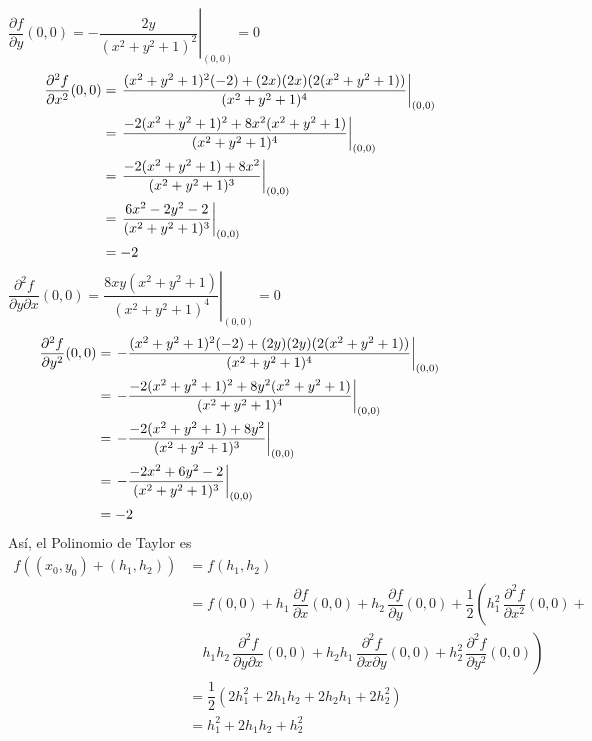 \documentclass[fleqn, 12pt]{article}
\newcommand{\derivadaparcial}[2]{\dfrac{\partial {#1}}{\partial {#2}}}
\newcommand{\derivadaparcialn}[3]{\dfrac{\partial^{#3} {#1}}{\partial {#2}^{#3}}}
\newcommand{\derivadaparcialnd}[3]{\dfrac{\partial^{2} {#1}}{\partial {#3} \partial {#2}}}
\begin{document}
\begin{enumerate}
        $ \derivadaparcial{f}{y} (0,0) = \left. - \dfrac{2y}{(x^2 + y^2 + 1)^2} \right|_{(0,0)} = 0 $
        \begin{align*}
            \hspace{-10mm} \derivadaparcialn{f}{x}{2} (0,0) &= \left. \dfrac{(x^2 + y^2 + 1)^2 (-2) + (2x)(2x)(2(x^2 + y^2 + 1))}{(x^2 + y^2 + 1)^4} \right|_{(0,0)} \\
            &= \left. \dfrac{-2(x^2 + y^2 + 1)^2 + 8x^2 (x^2 + y^2 + 1)}{(x^2 + y^2 + 1)^4} \right|_{(0,0)} \\
            &= \left. \dfrac{-2(x^2 + y^2 + 1) + 8x^2}{(x^2 + y^2 + 1)^3} \right|_{(0,0)} \\
            &= \left. \dfrac{6x^2 - 2y^2 - 2}{(x^2 + y^2 + 1)^3} \right|_{(0,0)} \\
            &= -2
        \end{align*}
        $ \derivadaparcialnd{f}{x}{y} (0,0) = \left. \dfrac{8xy(x^2 + y^2 + 1)}{(x^2 + y^2 + 1)^4} \right|_{(0,0)} = 0 $
        \begin{align*}
            \hspace{-10mm} \derivadaparcialn{f}{y}{2} (0,0) &= \left. - \dfrac{(x^2 + y^2 + 1)^2 (-2) + (2y)(2y)(2(x^2 + y^2 + 1))}{(x^2 + y^2 + 1)^4} \right|_{(0,0)} \\
            &= \left. - \dfrac{-2(x^2 + y^2 + 1)^2 + 8y^2 (x^2 + y^2 + 1)}{(x^2 + y^2 + 1)^4} \right|_{(0,0)} \\
            &= \left. - \dfrac{-2(x^2 + y^2 + 1) + 8y^2}{(x^2 + y^2 + 1)^3} \right|_{(0,0)} \\
            &= \left. - \dfrac{-2x^2 + 6y^2 - 2}{(x^2 + y^2 + 1)^3} \right|_{(0,0)} \\
            &= -2
        \end{align*}
        Así, el Polinomio de Taylor es
        \begin{align*}
            f((x_0, y_0) + (h_1, h_2)) &= f(h_1, h_2) \\
            &= f(0,0) + h_1 \, \derivadaparcial{f}{x} (0,0) + h_2 \, \derivadaparcial{f}{y} (0,0) + \dfrac{1}{2} \left( h_1^2 \, \derivadaparcialn{f}{x}{2} (0,0) \right. + \\
            & \quad \left. h_1 h_2 \, \derivadaparcialnd{f}{x}{y} (0,0) + h_2 h_1 \, \derivadaparcialnd{f}{y}{x} (0,0) + h_2^2 \, \derivadaparcialn{f}{y}{2} (0,0) \right) \\
            &= \dfrac{1}{2} \left( 2 h_1^2 + 2 h_1 h_2 + 2 h_2 h_1 + 2 h_2^2 \right) \\
            &= h_1^2 + 2 h_1 h_2 + h_2^2
        \end{align*}


\end{enumerate}
\end{document}
